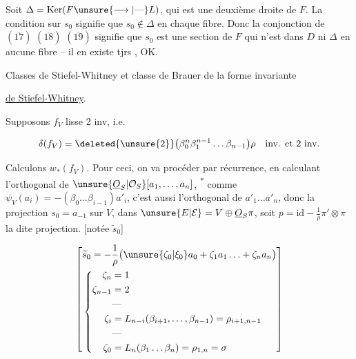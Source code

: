 Soit  $\Delta=\operatorname{Ker}(F\unsure{\longrightarrow|\text{---}}L)$, qui est une deuxième droite de $F$. La condition  sur $s_0$ signifie que $s_0\notin\Delta$ en chaque fibre. Donc la conjonction de $(\overline{17})$ $(\overline{18})$ $(\overline{19})$ signifie que $s_0$ est une section de $F$  qui n'est dans $D$ ni $\Delta$ en aucune fibre -- il en existe tjrs , OK.


Classes de Stiefel-Whitney et classe de Brauer de la forme invariante


\uline{ de Stiefel-Whitney}.

Supposons $f_V$ lisse  2 inv, i.e. 

\[\delta(f_V)=\deleted{\unsure{2}}\bigl(\beta_0^n\beta_1^{n-1}\ldots\beta_{n-1}\bigr)\rho\quad\text{inv. et 2 inv.}\]

Calculons $w_*(f_V)$. Pour ceci, on va procéder par récurrence, en calculant l'orthogonal de $\unsure{\underline O_S|\mathcal O_S}[a_1,\ldots,a_n]$, \textsuperscript{*} comme $\psi_V(a_i)=-(\beta_0\ldots\beta_{i-1})a'_i$, c'est aussi l'orthogonal de $a'_1\ldots a'_n$, donc  la projection   $s_0=a_{-1}$ sur $V$, dans $\unsure{E|\mathcal E}=V\oplus\underline O_S\pi$, soit $p=\mathrm{id}-\frac1\rho\pi'\otimes\pi$ la dite projection. [notée $\widetilde s_0$]


\[\left[\begin{aligned}&\widetilde s_0=-\frac1\rho\bigl(\unsure{\zeta_0|\xi_0}a_0+\zeta_1a_1\ldots+\zeta_na_n\bigr)\\ &\left\{\begin{aligned}\zeta_n&=1\\\zeta_{n-1}&=2\\ &\text{---}\\\zeta_i&=L_{n-i}(\beta_{i+1},\ldots,\beta_{n-1})=\rho_{i+1,n-1}\\ &\text{---}\\\zeta_0&=L_n(\beta_1\ldots\beta_n)=\rho_{1,n}=\sigma\end{aligned}\right.\end{aligned}\right]\]

